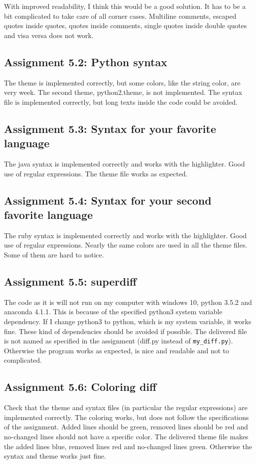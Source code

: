 \documentclass[a4paper]{article}
\begin{document}
With improved readability, I think this would be a good solution. It has to be a bit complicated to take care of all corner cases. Multiline comments, escaped quotes inside quotes, quotes inside comments, single quotes inside double quotes and visa versa does not work.

\subsection*{Assignment 5.2: Python syntax} \label{sec:assignment5.2}
The theme is implemented correctly, but some colors, like the string color, are very week. The second theme, python2.theme, is not implemented. The syntax file is implemented correctly, but long texts inside the code could be avoided. 

\subsection*{Assignment 5.3: Syntax for your favorite language}
The java syntax is implemented correctly and works with the highlighter. Good use of regular expressions. The theme file works as expected.

\subsection*{Assignment 5.4: Syntax for your second favorite language}
The ruby syntax is implemented correctly and works with the highlighter. Good use of regular expressions. Nearly the same colors are used in all the theme files. Some of them are hard to notice. 


\subsection*{Assignment 5.5: superdiff}
The code as it is will not run on my computer with windows 10, python 3.5.2 and anaconda 4.1.1. This is because of the specified python3 system variable dependency. If I change python3 to python, which is my system variable, it works fine. These kind of dependencies should be avoided if possible. The delivered file is not named as specified in the assignment (diff.py instead of \verb|my_diff.py|). Otherwise the program works as expected, is nice and readable and not to complicated.

\subsection*{Assignment 5.6:  Coloring diff}
Check that the theme and syntax files (in particular the regular expressions) are implemented correctly.
The coloring works, but does not follow the specifications of the assignment. Added lines should be green, removed lines should be red and no-changed lines should not have a specific color. The delivered theme file makes the added lines blue, removed lines red and no-changed lines green. Otherwise the syntax and theme works just fine. 
\end{document}
